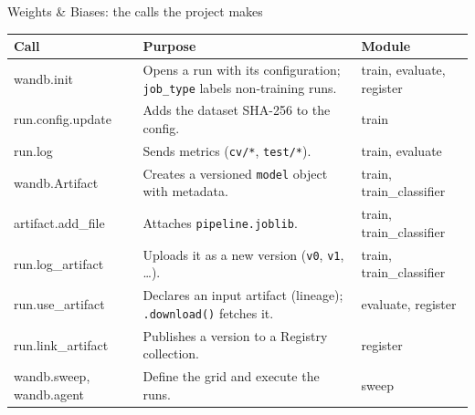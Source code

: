 \begin{frame}{Weights \& Biases: the calls the project makes}
\begingroup\footnotesize
\begin{tabularx}{\textwidth}{>{\ttfamily}l X >{\ttfamily}l}
\normalfont\bfseries Call & \bfseries Purpose & \normalfont\bfseries Module \\
\toprule
wandb.init & Opens a run with its configuration; \texttt{job\_type} labels non-training runs. & train, evaluate, register \\
\addlinespace[0.12em]
run.config.update & Adds the dataset SHA-256 to the config. & train \\
\addlinespace[0.12em]
run.log & Sends metrics (\texttt{cv/*}, \texttt{test/*}). & train, evaluate \\
\addlinespace[0.12em]
wandb.Artifact & Creates a versioned \texttt{model} object with metadata. & train, train\_classifier \\
\addlinespace[0.12em]
artifact.add\_file & Attaches \texttt{pipeline.joblib}. & train, train\_classifier \\
\addlinespace[0.12em]
run.log\_artifact & Uploads it as a new version (\texttt{v0}, \texttt{v1}, \dots). & train, train\_classifier \\
\addlinespace[0.12em]
run.use\_artifact & Declares an input artifact (lineage); \texttt{.download()} fetches it. & evaluate, register \\
\addlinespace[0.12em]
run.link\_artifact & Publishes a version to a Registry collection. & register \\
\addlinespace[0.12em]
wandb.sweep, wandb.agent & Define the grid and execute the runs. & sweep \\
\bottomrule
\end{tabularx}
\par\endgroup
\coursefooter
\end{frame}

